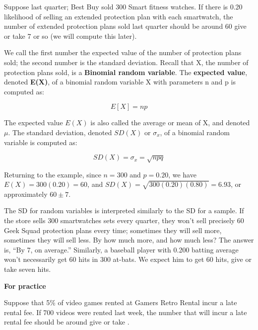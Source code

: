 \documentclass[11pt, chapterprefix=true]{scrbook}\usepackage[]{graphicx}\usepackage[]{color}
\begin{document}
Suppose last quarter; Best Buy sold 300 Smart fitness watches.  If there is 0.20 likelihood of selling an extended protection plan with each smartwatch, the number of extended protection plans sold last quarter should be around 60 give or take 7 or so (we will compute this later).

We call the first number the expected value of the number of protection plans sold; the second number is the standard deviation.  Recall that X, the number of protection plans sold, is a \textbf{Binomial random variable}.  The \textbf{expected value}, denoted \textbf{E(X)}, of a binomial random variable X with parameters n and p is computed as:

\begin{equation*}
E[ X ] = np
\end{equation*}

The expected value $E(X)$ is also called the average or mean of X, and denoted $\mu$.  The standard deviation, denoted $SD(X)$ or $\sigma_x$, of a binomial random variable is computed as:

\begin{equation*}
SD(X) = \sigma_x = \sqrt{npq}
\end{equation*}

Returning to the example, since $n = 300$ and $p = 0.20$, we have $E(X) = 300(0.20) = 60$, and $SD(X) = \sqrt{300(0.20)(0.80)} = 6.93$, or approximately $60 \pm 7$.

The SD for random variables is interpreted similarly to the SD for a sample.  If the store sells 300 smartwatches sets every quarter, they won't sell precisely 60 Geek Squad protection plans every time; sometimes they will sell more, sometimes they will sell less.   By how much more, and how much less?  The answer is, ``By 7, on average.''   Similarly, a baseball player with 0.200 batting average won't necessarily get 60 hits in 300 at-bats.  We expect him to get 60 hits, give or take seven hits.

\begin{minipage}[ht]{3cm}

\textbf{For practice}
\end{minipage}
\begin{minipage}[ht]{12cm}

Suppose that 5\% of video games rented at Gamers Retro Rental incur a late rental fee. If 700 videos were rented last week, the number that will incur a late rental fee should be around \underline{\phantom{xxxxxxxxxx}} give or take \underline{\phantom{xxxxxxxxxx}}.

\end{minipage}
\end{document}

